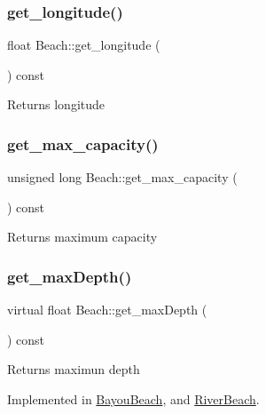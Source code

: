 \subsubsection{\texorpdfstring{get\+\_\+longitude()}{get\_longitude()}}
{\footnotesize\ttfamily float Beach\+::get\+\_\+longitude (\begin{DoxyParamCaption}{ }\end{DoxyParamCaption}) const}

\begin{DoxyReturn}{Returns}
longitude 
\end{DoxyReturn}
\mbox{\label{class_beach_a428ee21d8889b86bd05f1460a0a1be34}} 
\subsubsection{\texorpdfstring{get\+\_\+max\+\_\+capacity()}{get\_max\_capacity()}}
{\footnotesize\ttfamily unsigned long Beach\+::get\+\_\+max\+\_\+capacity (\begin{DoxyParamCaption}{ }\end{DoxyParamCaption}) const}

\begin{DoxyReturn}{Returns}
maximum capacity 
\end{DoxyReturn}
\mbox{\label{class_beach_a5942f7aa56af3b61d2974a754913ab7e}} 
\subsubsection{\texorpdfstring{get\+\_\+max\+Depth()}{get\_maxDepth()}}
{\footnotesize\ttfamily virtual float Beach\+::get\+\_\+max\+Depth (\begin{DoxyParamCaption}{ }\end{DoxyParamCaption}) const\hspace{0.3cm}{\ttfamily [pure virtual]}}

\begin{DoxyReturn}{Returns}
maximun depth 
\end{DoxyReturn}


Implemented in \hyperlink{class_bayou_beach_a9187c703f1cb4e36831ca5e116ba758a}{Bayou\+Beach}, and \hyperlink{class_river_beach_a0bb0a4f13ad1e2d7576d5ef641057e11}{River\+Beach}.

